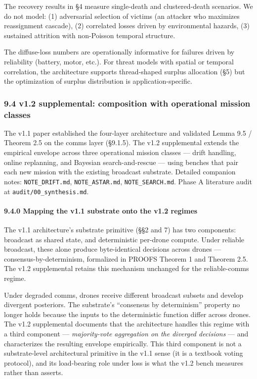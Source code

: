 The recovery results in §4 measure single-death and clustered-death
scenarios. We do not model: (1) adversarial selection of victims (an
attacker who maximizes reassignment cascade), (2) correlated losses
driven by environmental hazards, (3) sustained attrition with
non-Poisson temporal structure.

The diffuse-loss numbers are operationally informative for failures
driven by reliability (battery, motor, etc.). For threat models with
spatial or temporal correlation, the architecture supports thread-shaped
surplus allocation (§5) but the optimization of surplus distribution is
application-specific.

\subsubsection{9.4 v1.2 supplemental: composition with operational
mission
classes}\label{v1.2-supplemental-composition-with-operational-mission-classes}

The v1.1 paper established the four-layer architecture and validated
Lemma 9.5 / Theorem 2.5 on the comms layer (§9.1.5). The v1.2
supplemental extends the empirical envelope across three operational
mission classes --- drift handling, online replanning, and Bayesian
search-and-rescue --- using benches that pair each new mission with the
existing broadcast substrate. Detailed companion notes:
\texttt{NOTE\_DRIFT.md}, \texttt{NOTE\_ASTAR.md},
\texttt{NOTE\_SEARCH.md}. Phase A literature audit at
\texttt{audit/00\_synthesis.md}.

\paragraph{9.4.0 Mapping the v1.1 substrate onto the v1.2
regimes}\label{mapping-the-v1.1-substrate-onto-the-v1.2-regimes}

The v1.1 architecture's substrate primitive (§§2 and 7) has two
components: broadcast as shared state, and deterministic per-drone
compute. Under reliable broadcast, these alone produce byte-identical
decisions across drones --- consensus-by-determinism, formalized in
PROOFS Theorem 1 and Theorem 2.5. The v1.2 supplemental retains this
mechanism unchanged for the reliable-comms regime.

Under degraded comms, drones receive different broadcast subsets and
develop divergent posteriors. The substrate's ``consensus by
determinism'' property no longer holds because the inputs to the
deterministic function differ across drones. The v1.2 supplemental
documents that the architecture handles this regime with a third
component --- \emph{majority-vote aggregation on the diverged decisions}
--- and characterizes the resulting envelope empirically. This third
component is not a substrate-level architectural primitive in the v1.1
sense (it is a textbook voting protocol), and its load-bearing role
under loss is what the v1.2 bench measures rather than asserts.

